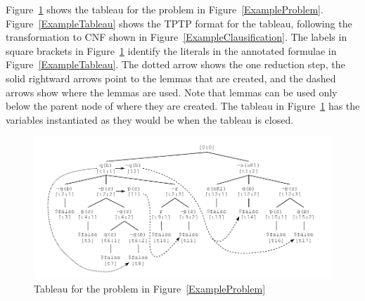 \documentclass[runningheads]{llncs}
\begin{document}
Figure~\ref{TableauPicture} shows the tableau for the problem in Figure~\ref{ExampleProblem}.
Figure~\ref{ExampleTableau} shows the TPTP format for the tableau, following the transformation
to CNF shown in Figure~\ref{ExampleClausification}.
The labels in square brackets in Figure~\ref{TableauPicture} identify the literals in the 
annotated formulae in Figure~\ref{ExampleTableau}.
The dotted arrow shows the one reduction step, the solid rightward arrows point to the lemmas that 
are created, and the dashed arrows show where the lemmas are used.
Note that lemmas can be used only below the parent node of where they are created. 
The tableau in Figure~\ref{TableauPicture} has the variables instantiated as they would be when 
the tableau is closed.

\begin{figure}[htb]
\centering
\includegraphics[width=1.0\textwidth]{Tableau.pdf}
\vspace*{-1em}
\caption{Tableau for the problem in Figure~\ref{ExampleProblem}}
\label{TableauPicture}
\end{figure}
\end{document}
